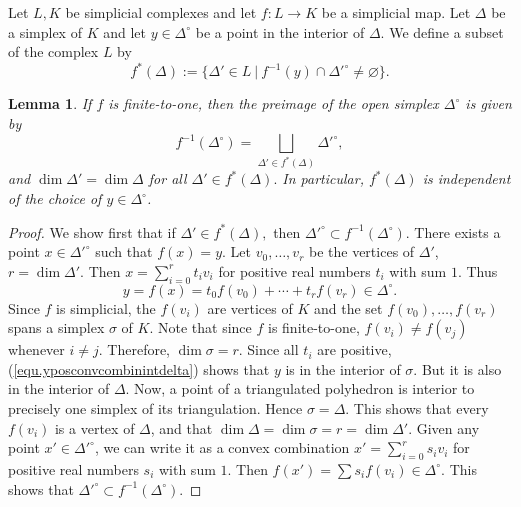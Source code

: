 \documentclass{amsart}
\newtheorem{lemma}[thm]{Lemma}
\theoremstyle{definition}
\theoremstyle{remark}
\begin{document}
Let $L,K$ be simplicial complexes and
let $f: L\to K$ be a simplicial map. Let $\Delta$ be a 
simplex of $K$ and let $y\in \Delta^\circ$ be a point in the
interior of $\Delta$.
We define a subset of the complex $L$ by
\[ f^* (\Delta) := \{ \Delta' \in L ~|~ 
   f^{-1} (y) \cap \Delta'^\circ \not= \varnothing \}.  \]
\begin{lemma} \label{lem.fstardelta}
If $f$ is finite-to-one, then
the preimage of the open simplex $\Delta^\circ$ is given by
\[ f^{-1} (\Delta^\circ) = 
      \bigsqcup_{\Delta' \in f^* (\Delta)} \Delta'^\circ,  \]
and
$\dim \Delta' = \dim \Delta$ for all $\Delta' \in f^* (\Delta).$
In particular, $f^* (\Delta)$ is independent of the choice
of $y \in \Delta^\circ$.
\end{lemma}
\begin{proof}
We show first that if $\Delta' \in f^* (\Delta),$
then $\Delta'^\circ \subset f^{-1} (\Delta^\circ)$.
There exists a point $x\in \Delta'^\circ$ such that $f(x)=y$.
Let $v_0,\ldots, v_r$ be the vertices of $\Delta'$, $r=\dim \Delta'$.
Then
$x = \sum_{i=0}^r t_i v_i$
for positive real numbers $t_i$ with sum $1$.
Thus
\begin{equation} \label{equ.yposconvcombinintdelta} 
y = f(x) = t_0 f(v_0) + \cdots + t_r f(v_r) \in \Delta^\circ. 
\end{equation}
Since $f$ is simplicial, the $f(v_i)$ are vertices of $K$
and the set $f(v_0), \ldots, f(v_r)$ spans a simplex $\sigma$
of $K$. 
Note that since $f$ is finite-to-one, $f(v_i) \not= f(v_j)$
whenever $i\not= j$. Therefore, $\dim \sigma =r$.
Since all $t_i$ are positive, (\ref{equ.yposconvcombinintdelta}) 
shows that $y$ is in the 
interior of $\sigma$. But it is also in the interior of $\Delta$.
Now, a point of a triangulated polyhedron is interior to precisely one simplex
of its triangulation. Hence $\sigma = \Delta$. 
This shows that every $f(v_i)$ is a vertex of $\Delta$, and
that $\dim \Delta = \dim \sigma = r = \dim \Delta'$.
Given any point $x' \in \Delta'^\circ$, we can write it as a convex
combination
$x' = \sum_{i=0}^r s_i v_i$
for positive real numbers $s_i$ with sum $1$.
Then
$f(x') = \sum s_i f(v_i) \in \Delta^\circ.$
This shows that $\Delta'^\circ \subset f^{-1} (\Delta^\circ)$.


\end{proof}
\end{document}
